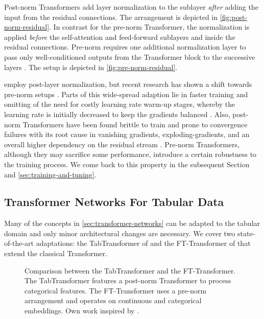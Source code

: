 Post-norm Transformers add layer normalization to the sublayer \emph{after} adding the input from the residual connections. The arrangement is depicted in \cref{fig:post-norm-residual}. In contrast for the pre-norm Transformer, the normalization is applied \emph{before} the self-attention and feed-forward sublayers and inside the residual connections. Pre-norm requires one additional normalization layer to pass only well-conditioned outputs from the Transformer block to the successive layers \autocite[][5]{xiongLayerNormalizationTransformer2020}. The setup is depicted in \cref{fig:pre-norm-residual}.

\textcite[][3]{vaswaniAttentionAllYou2017} employ post-layer normalization, but recent research has shown a shift towards pre-norm setups \autocite[][4]{narangTransformerModificationsTransfer2021}. Parts of this wide-spread adaption lie in faster training and omitting of the need for costly learning rate warm-up stages, whereby the learning rate is initially decreased to keep the gradients balanced \autocites[][2]{xiongLayerNormalizationTransformer2020}[][8]{liuUnderstandingDifficultyTraining2020}. Also, post-norm Transformers have been found brittle to train and prone to convergence failures with its root cause in vanishing gradients, \glspl{exploding-gradient}, and an overall higher dependency on the residual stream \autocites[][8]{liuUnderstandingDifficultyTraining2020}[][1812]{wangLearningDeepTransformer2019}. Pre-norm Transformers, although they may sacrifice some performance, introduce a certain robustness to the training process. We come back to this property in the subsequent Section and \cref{sec:training-and-tuning}.

\subsection{Transformer Networks For Tabular Data}\label{sec:tabular-transformer}

Many of the concepts in \cref{sec:transformer-networks} can be adapted to the tabular domain and only minor architectural changes are necessary. We cover two state-of-the-art adaptations: the TabTransformer of \textcite[][2]{huangTabTransformerTabularData2020} and the FT-Transformer of \textcite[][4]{gorishniyRevisitingDeepLearning2021} that extend the classical Transformer.

\begin{figure}[ht]
\hfill
{}
\hfill
{}
\hfill\null
\caption[Comparison Between Tabular Transformer.]{Comparison between the TabTransformer and the FT-Transformer. The TabTransformer features a post-norm Transformer to process categorical features. The FT-Transformer uses a pre-norm arrangement and operates on continuous and categorical embeddings. Own work inspired by \textcites[][2]{huangTabTransformerTabularData2020}[][4--5]{gorishniyRevisitingDeepLearning2021}.}
\label{fig:tabular-transformer}
\end{figure}

